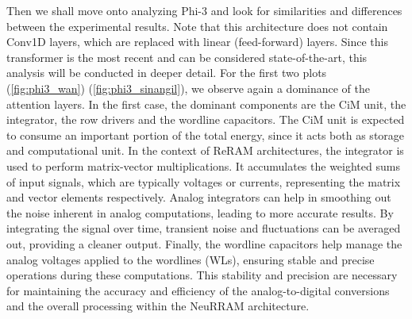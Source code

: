 \documentclass[conference]{IEEEtran}
\begin{document}
Then we shall move onto analyzing Phi-3 and look for similarities and differences between the experimental results. Note that this architecture does not contain Conv1D layers, which are replaced with linear (feed-forward) layers. Since this transformer is the most recent and can be considered state-of-the-art, this analysis will be conducted in deeper detail. 
For the first two plots (\ref{fig:phi3_wan}) (\ref{fig:phi3_sinangil}), we observe again a dominance of the attention layers. In the first case, the dominant components are the CiM unit, the integrator, the row drivers and the wordline capacitors. The CiM unit is expected to consume an important portion of the total energy, since it acts both as storage and computational unit. In the context of ReRAM architectures, the integrator is used to perform matrix-vector multiplications. It accumulates the weighted sums of input signals, which are typically voltages or currents, representing the matrix and vector elements respectively. Analog integrators can help in smoothing out the noise inherent in analog computations, leading to more accurate results. By integrating the signal over time, transient noise and fluctuations can be averaged out, providing a cleaner output. Finally, the wordline capacitors help manage the analog voltages applied to the wordlines (WLs), ensuring stable and precise operations during these computations. This stability and precision are necessary for maintaining the accuracy and efficiency of the analog-to-digital conversions and the overall processing within the NeuRRAM architecture.
\end{document}

